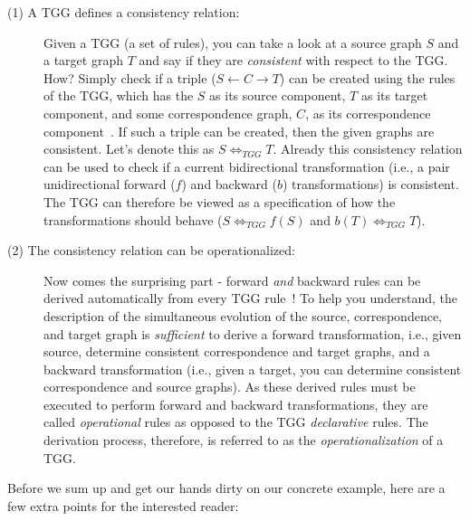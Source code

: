 \begin{description}

\item[(1) A TGG defines a consistency relation:]
	Given a TGG (a set of rules), you can take a look at a source graph $S$ and a target graph $T$ and say if they are \emph{consistent} with
	respect to the TGG. How?  Simply check if a triple ($S\leftarrow C\rightarrow T$) can be created using the rules of the TGG, which has the $S$
	as its source component, $T$ as its target component, and some correspondence graph, $C$, as its correspondence component~\cite{Hermann2011a}. If such a triple
	can be created, then the given graphs are consistent. Let's denote this as $S \Leftrightarrow_{TGG} T$. Already this consistency relation can be used to check
	if a current bidirectional transformation (i.e., a pair unidirectional forward ($f$) and backward ($b$) transformations) is consistent. The TGG can therefore
	be viewed as a specification of how the transformations should behave ($S \Leftrightarrow_{TGG} f(S)$ and $b(T) \Leftrightarrow_{TGG} T$).
	
\item[(2) The consistency relation can be operationalized:]
	Now comes the surprising part - forward \emph{and} backward rules can be derived automatically from every TGG
	rule~\cite{Giese2010,Hermann2011a}! To help you understand, the description of the simultaneous evolution of the source, correspondence, and
	target graph is \emph{sufficient} to derive a forward transformation, i.e., given source, determine consistent correspondence and target graphs, and a
	backward transformation (i.e., given a target, you can determine consistent correspondence and source graphs). As these derived rules must be executed to
	perform forward and backward transformations, they are called \emph{operational} rules as opposed to the TGG \emph{declarative} rules. The derivation process,
	therefore, is referred to as the \emph{operationalization} of a TGG.
	
\end{description}

Before we sum up and get our hands dirty on our concrete example, here are a few extra points for the interested reader:  

